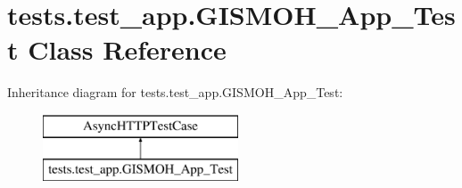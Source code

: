\hypertarget{classtests_1_1test__app_1_1_g_i_s_m_o_h___app___test}{\section{tests.\-test\-\_\-app.\-G\-I\-S\-M\-O\-H\-\_\-\-App\-\_\-\-Test Class Reference}
\label{classtests_1_1test__app_1_1_g_i_s_m_o_h___app___test}
}
Inheritance diagram for tests.\-test\-\_\-app.\-G\-I\-S\-M\-O\-H\-\_\-\-App\-\_\-\-Test\-:\begin{figure}[H]
\begin{center}
\leavevmode
\includegraphics[height=2.000000cm]{classtests_1_1test__app_1_1_g_i_s_m_o_h___app___test}
\end{center}
\end{figure}
